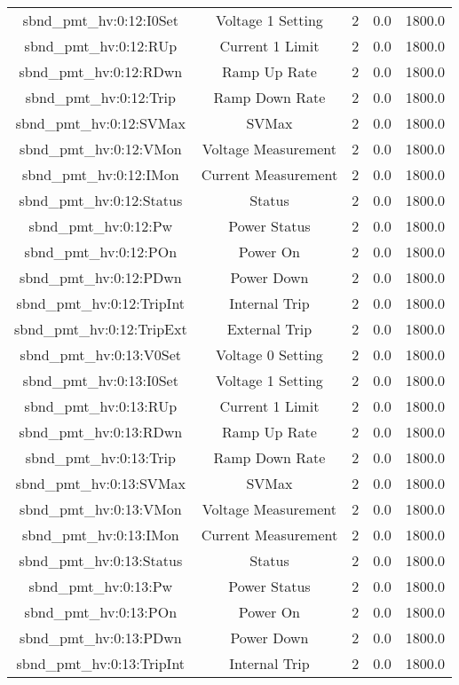 \begin{table}[ptb]
\begin{tabular}{c | c c c c}
sbnd_pmt_hv:0:12:I0Set & Voltage 1 Setting & 2 & 0.0 & 1800.0\\ 
sbnd_pmt_hv:0:12:RUp & Current 1 Limit & 2 & 0.0 & 1800.0\\ 
sbnd_pmt_hv:0:12:RDwn & Ramp Up Rate & 2 & 0.0 & 1800.0\\ 
sbnd_pmt_hv:0:12:Trip & Ramp Down Rate & 2 & 0.0 & 1800.0\\ 
sbnd_pmt_hv:0:12:SVMax & SVMax & 2 & 0.0 & 1800.0\\ 
sbnd_pmt_hv:0:12:VMon & Voltage Measurement & 2 & 0.0 & 1800.0\\ 
sbnd_pmt_hv:0:12:IMon & Current Measurement & 2 & 0.0 & 1800.0\\ 
sbnd_pmt_hv:0:12:Status & Status & 2 & 0.0 & 1800.0\\ 
sbnd_pmt_hv:0:12:Pw & Power Status & 2 & 0.0 & 1800.0\\ 
sbnd_pmt_hv:0:12:POn & Power On & 2 & 0.0 & 1800.0\\ 
sbnd_pmt_hv:0:12:PDwn & Power Down & 2 & 0.0 & 1800.0\\ 
sbnd_pmt_hv:0:12:TripInt & Internal Trip & 2 & 0.0 & 1800.0\\ 
sbnd_pmt_hv:0:12:TripExt & External Trip & 2 & 0.0 & 1800.0\\ 
sbnd_pmt_hv:0:13:V0Set & Voltage 0 Setting & 2 & 0.0 & 1800.0\\ 
sbnd_pmt_hv:0:13:I0Set & Voltage 1 Setting & 2 & 0.0 & 1800.0\\ 
sbnd_pmt_hv:0:13:RUp & Current 1 Limit & 2 & 0.0 & 1800.0\\ 
sbnd_pmt_hv:0:13:RDwn & Ramp Up Rate & 2 & 0.0 & 1800.0\\ 
sbnd_pmt_hv:0:13:Trip & Ramp Down Rate & 2 & 0.0 & 1800.0\\ 
sbnd_pmt_hv:0:13:SVMax & SVMax & 2 & 0.0 & 1800.0\\ 
sbnd_pmt_hv:0:13:VMon & Voltage Measurement & 2 & 0.0 & 1800.0\\ 
sbnd_pmt_hv:0:13:IMon & Current Measurement & 2 & 0.0 & 1800.0\\ 
sbnd_pmt_hv:0:13:Status & Status & 2 & 0.0 & 1800.0\\ 
sbnd_pmt_hv:0:13:Pw & Power Status & 2 & 0.0 & 1800.0\\ 
sbnd_pmt_hv:0:13:POn & Power On & 2 & 0.0 & 1800.0\\ 
sbnd_pmt_hv:0:13:PDwn & Power Down & 2 & 0.0 & 1800.0\\ 
sbnd_pmt_hv:0:13:TripInt & Internal Trip & 2 & 0.0 & 1800.0\\ 

\end{tabular}
\end{table}
